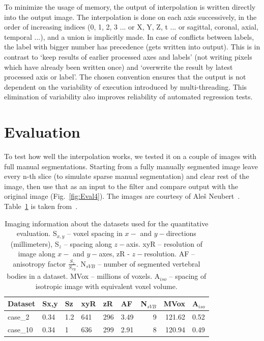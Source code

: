 \documentclass{InsightArticle}
\begin{document}
To minimize the usage of memory, the output of interpolation is written
directly into the output image.
The interpolation is done on each axis successively,
in the order of increasing indices (0, 1, 2, 3 ... or X, Y, Z, t ...
or sagittal, coronal, axial, temporal ...), and a union is implicitly made.
In case of conflicts between labels,
the label with bigger number has precedence (gets written into output).
This is in contrast to `keep results of earlier processed axes and labels'
(not writing pixels which have already been written once)
and `overwrite the result by latest processed axis or label'.
The chosen convention ensures that the output is not dependent on the
variability of execution introduced by multi-threading.
This elimination of variability also improves
reliability of automated regression tests.


\section{Evaluation}

To test how well the interpolation works,
we tested it on a couple of images with full manual segmentations.
Starting from a fully manually segmented image
leave every n-th slice (to simulate sparse manual segmentation)
and clear rest of the image,
then use that as an input to the filter
and compare output with the original image (Fig.~\ref{fig:Eval4}).
The images are courtesy of Ale{\v s} Neubert~\cite{Neubert2012}.
Table~\ref{tab:dsI} is taken from~\cite{ZukicCGF}.

\begin{table}[htbp]
\centering
\begin{tabular}{|l|l|l|l|l|l|r|r|l|}
\hline
\textbf{Dataset} & \textbf{Sx,y} & \textbf{Sz} & \textbf{xyR} & \textbf{zR} & \textbf{AF} & \textbf{N$_{sVB}$} & \textbf{MVox} & \textbf{A$_{iso}$} \\ \hline
case\_2 & 0.34 & 1.2 & 641 & 296 & 3.49 & 9 & 121.62 & 0.52 \\ \hline
case\_10 & 0.34 & 1 & 636 & 299 & 2.91 & 8 & 120.94 & 0.49 \\ \hline
\end{tabular}
\caption{
Imaging information about the datasets used for the quantitative evaluation.
S$_{x,y}$ -- voxel spacing in $x-$ and $y-$directions (millimeters),
S$_z$ -- spacing along $z-$axis.
xyR -- resolution of image along $x-$ and $y-$axes, zR - $z-$resolution.
AF -- anisotropy factor $\frac{S_z}{S_{xy}}$.
N$_{sVB}$ -- number of segmented vertebral bodies in a dataset.
MVox -- millions of voxels.
A$_{iso}$ -- spacing of isotropic image with equivalent voxel volume.
}
\label{tab:dsI}
\end{table}
\end{document}
